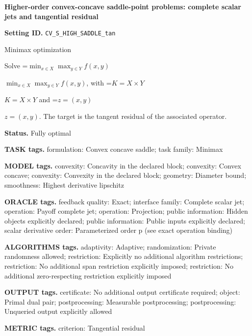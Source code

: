 \documentclass[10pt,a4paper]{article}
\newcommand{\AtlasMath}[1]{\par\begingroup\centering\setbox0=\hbox{$\displaystyle #1$}\ifdim\wd0>1.4\linewidth\typeout{ATLAS WIDE FORMULA: \the\wd0}\fi\ifdim\wd0>\linewidth\resizebox{\linewidth}{!}{\box0}\else\box0\fi\par\endgroup}
\newcommand{\AtlasInlineMath}[1]{\begingroup\setbox0=\hbox{$#1$}\ifdim\wd0>.4\linewidth\endgroup\AtlasMath{#1}\else\endgroup$#1$\fi}
\begin{document}
\raggedright

{\LARGE\bfseries\sffamily\color{AtlasNavy} Higher-order convex-concave saddle-point problems: complete scalar jets and tangential residual\par}\vspace{5pt}


\textbf{Setting ID.} \texttt{CV\_\allowbreak{}S\_\allowbreak{}HIGH\_\allowbreak{}SADDLE\_\allowbreak{}tan}



Minimax optimization



Solve \AtlasInlineMath{\min_{x\in X}\max_{y\in Y}f(x,y)}, with \AtlasInlineMath{K=X\times Y} and \AtlasInlineMath{z=(x,y)}. The target is the tangent residual of the associated operator.



\textbf{Status.} Fully optimal



\textbf{TASK tags.} formulation: Convex concave saddle; task family: Minimax



\textbf{MODEL tags.} convexity: Concavity in the declared block; convexity: Convex concave; convexity: Convexity in the declared block; geometry: Diameter bound; smoothness: Highest derivative lipschitz



\textbf{ORACLE tags.} feedback quality: Exact; interface family: Complete scalar jet; operation: Payoff complete jet; operation: Projection; public information: Hidden objects explicitly declared; public information: Public inputs explicitly declared; scalar derivative order: Parameterized order p (see exact operation binding)



\textbf{ALGORITHMS tags.} adaptivity: Adaptive; randomization: Private randomness allowed; restriction: Explicitly no additional algorithm restrictions; restriction: No additional span restriction explicitly imposed; restriction: No additional zero-respecting restriction explicitly imposed



\textbf{OUTPUT tags.} certificate: No additional output certificate required; object: Primal dual pair; postprocessing: Measurable postprocessing; postprocessing: Unqueried output explicitly allowed



\textbf{METRIC tags.} criterion: Tangential residual
\end{document}
